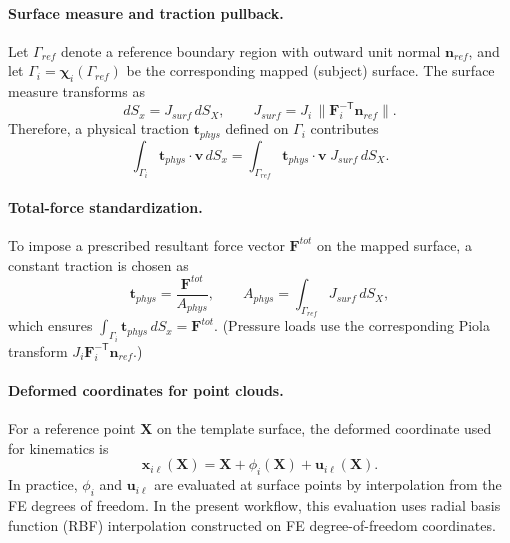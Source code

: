 \paragraph{Surface measure and traction pullback.}
Let $\Gamma_{ref}$ denote a reference boundary region with outward unit normal $\mathbf{n}_{ref}$, and let $\Gamma_i=\boldsymbol{\chi}_i(\Gamma_{ref})$ be the corresponding mapped (subject) surface. The surface measure transforms as
\begin{equation}
dS_x = J_{surf}\, dS_X,
\qquad
J_{surf}=J_i\,\big\|\mathbf{F}_i^{-\mathsf{T}}\mathbf{n}_{ref}\big\|.
\end{equation}
Therefore, a physical traction $\mathbf{t}_{phys}$ defined on $\Gamma_i$ contributes
\begin{equation}
\int_{\Gamma_i} \mathbf{t}_{phys}\cdot \mathbf{v}\, dS_x
=
\int_{\Gamma_{ref}} \mathbf{t}_{phys}\cdot \mathbf{v}\; J_{surf}\, dS_X.
\end{equation}

\paragraph{Total-force standardization.}
To impose a prescribed resultant force vector $\mathbf{F}^{tot}$ on the mapped surface, a constant traction is chosen as
\begin{equation}
\mathbf{t}_{phys}=\frac{\mathbf{F}^{tot}}{A_{phys}},
\qquad
A_{phys}=\int_{\Gamma_{ref}} J_{surf}\, dS_X,
\end{equation}
which ensures $\int_{\Gamma_i} \mathbf{t}_{phys}\, dS_x=\mathbf{F}^{tot}$. (Pressure loads use the corresponding Piola transform $J_i \mathbf{F}_i^{-\mathsf{T}}\mathbf{n}_{ref}$.)

\paragraph{Deformed coordinates for point clouds.}
For a reference point $\mathbf{X}$ on the template surface, the deformed coordinate used for kinematics is
\begin{equation}
\mathbf{x}_{i\ell}(\mathbf{X})=\mathbf{X}+\phi_i(\mathbf{X})+\mathbf{u}_{i\ell}(\mathbf{X}).
\end{equation}
In practice, $\phi_i$ and $\mathbf{u}_{i\ell}$ are evaluated at surface points by interpolation from the FE degrees of freedom.
In the present workflow, this evaluation uses radial basis function (RBF) interpolation constructed on FE degree-of-freedom coordinates.


